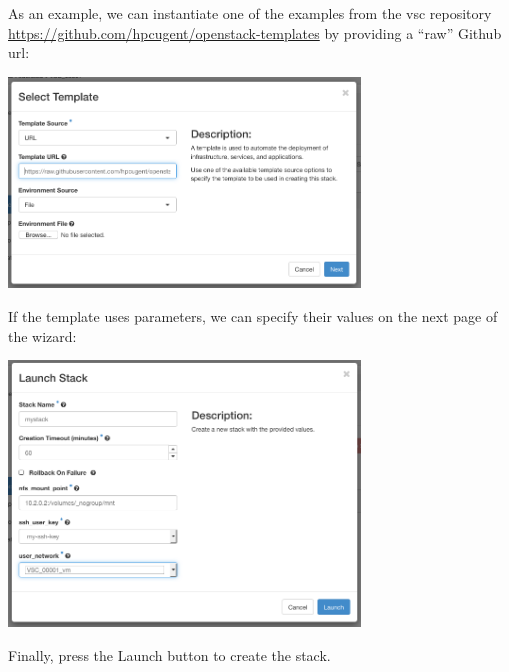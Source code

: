 As an example, we can instantiate one of the examples from the vsc
repository \url{https://github.com/hpcugent/openstack-templates} by
providing a ``raw'' Github url:
\begin{center}
  \includegraphics[width=0.7\textwidth]{img/launch_stack_template}
\end{center}
If the template uses parameters, we can specify their values on the next page of the wizard:
\begin{center}
  \includegraphics[width=0.7\textwidth]{img/launch_stack_parameters}
\end{center}
Finally, press the Launch button to create the stack.

